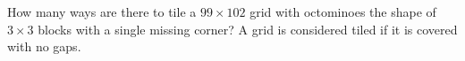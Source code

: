 How many ways are there to tile a $99\times 102$ grid with octominoes the shape of $3\times 3$ blocks with a single missing corner? A grid is considered tiled if it is covered with no gaps.
